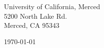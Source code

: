 \begin{minipage}{0.49\textwidth}
\begin{flushleft}
\noindent 
University of California, Merced\\
5200 North Lake Rd. \\
Merced, CA 95343
\end{flushleft}
\end{minipage}
\begin{minipage}{0.47\textwidth}
\begin{flushright}
\today
\end{flushright}
\end{minipage} \\

\newcommand{\univ}{University of California, Merced}
\newcommand{\univshort}{UC Merced}
\newcommand{\degree}{Ph.D.}
\newcommand{\dept}{Computer Science}
